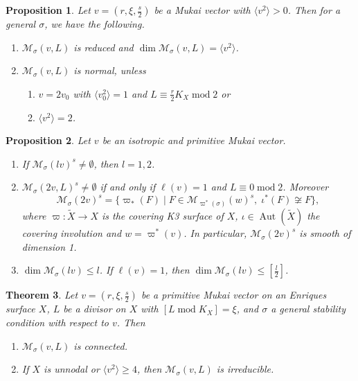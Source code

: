 \documentclass[leqno,11pt]{amsart}
\def\Aut{\mathop{\mathrm{Aut}}\nolimits}
\def\dim{\mathop{\mathrm{dim}}\nolimits}
\def\mod{\mathop{\mathrm{mod}}\nolimits}
\newtheorem{Thm}{Theorem}[section]
\newtheorem{Prop}[Thm]{Proposition}
\theoremstyle{definition}
\def\MM{\ensuremath{\mathcal M}}
\def\cal{\mathcal}
\begin{document}
{\begin{Prop}\label{Prop:normal/reduced}
Let $v=(r,\xi,\frac{s}{2})$ 
be a Mukai vector with $\langle v^2 \rangle>0$. Then
for a general $\sigma$, we have the following.
\begin{enumerate}
\item[(1)]
$\MM_\sigma(v,L)$ is reduced and  
$\dim \MM_\sigma(v,L)=\langle v^2 \rangle$.
\item[(2)]
$\MM_\sigma(v,L)$ is normal, unless
\begin{enumerate}
\item[(i)] $v=2v_0$ with $\langle v_0^2 \rangle=1$ and 
$L \equiv \frac{r}{2}K_X \mod 2$ or
\item[(ii)] $\langle v^2 \rangle=2$.
\end{enumerate}
\end{enumerate}
\end{Prop}



\begin{Prop}\label{prop:isotropic}
Let $v$ be an isotropic and primitive Mukai vector.
\begin{enumerate}
\item[(1)]
If $\MM_\sigma(l v)^s \ne \emptyset$, then
$l=1,2$.
\item[(2)]
$\MM_\sigma(2 v,L)^s \ne \emptyset $
if and only if $\ell(v)=1$ and $L \equiv 0 \mod 2$.
Moreover
$$
\MM_\sigma(2 v)^s=\{\varpi_*(F) \mid F \in 
\MM_{\varpi^*(\sigma)}(w)^s,\;
\iota^*(F) \not \cong F \},
$$ 
where $\varpi:\widetilde{X} \to X$ is the covering K3 surface of $X$,
$\iota \in \Aut(\widetilde{X})$ the covering involution and
$w=\varpi^*(v)$.
In particular, $\MM_\sigma(2v)^s$ is smooth of
dimension 1.
\item[(3)]
$\dim \MM_\sigma(lv) \leq l$.
If $\ell(v)=1$, then
$\dim \MM_\sigma(lv) \leq [\frac{l}{2}]$.
\end{enumerate} 
\end{Prop}





\begin{Thm}\label{Thm:intro:irred}
Let $v=(r,\xi,\frac{s}{2})$ 
be a primitive Mukai vector on an Enriques surface $X$,
$L$ be a divisor on $X$ with $[L \mod K_X]=\xi$, and 
$\sigma$ a general stability condition with respect to $v$. Then
\begin{enumerate}
\item[(1)]
$\MM_\sigma(v,L)$ is connected.
\item[(2)]
If  $X$ is unnodal or $\langle v^2 \rangle \geq 4$, 
then $\MM_\sigma(v,L)$ is irreducible.
\end{enumerate}
\end{Thm}
}
\end{document}
